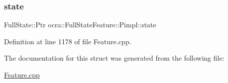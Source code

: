 \subsubsection{\texorpdfstring{state}{state}}
{\footnotesize\ttfamily Full\+State\+::\+Ptr ocra\+::\+Full\+State\+Feature\+::\+Pimpl\+::state}



Definition at line 1178 of file Feature.\+cpp.



The documentation for this struct was generated from the following file\+:\begin{DoxyCompactItemize}
\item 
\hyperlink{Feature_8cpp}{Feature.\+cpp}\end{DoxyCompactItemize}
